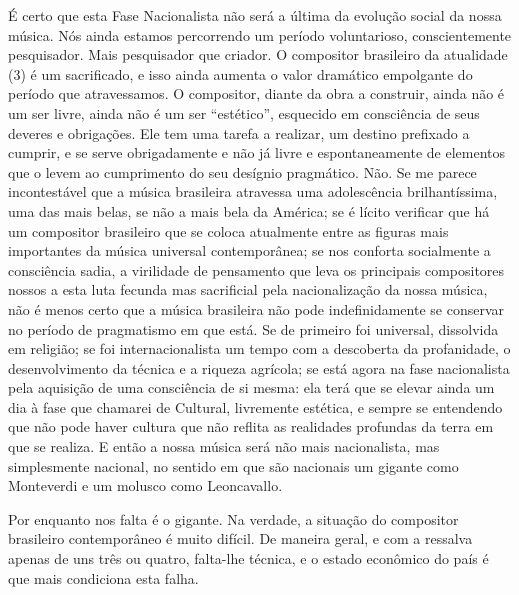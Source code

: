 É certo que esta Fase Nacionalista não será a última da evolução social
da nossa música. Nós ainda estamos percorrendo um período voluntarioso,
conscientemente pesquisador. Mais pesquisador que criador. O compositor
brasileiro da atualidade (3) é um sacrificado, e isso ainda aumenta o
valor dramático empolgante do período que atravessamos. O compositor,
diante da obra a construir, ainda não é um ser livre, ainda não é um ser
``estético'', esquecido em consciência de seus deveres e obrigações. Ele
tem uma tarefa a realizar, um destino prefixado a cumprir, e se serve
obrigadamente e não já livre e espontaneamente de elementos que o levem
ao cumprimento do seu desígnio pragmático. Não. Se me parece
incontestável que a música brasileira atravessa uma adolescência
brilhantíssima, uma das mais belas, se não a mais bela da América; se é
lícito verificar que há um compositor brasileiro que se coloca
atualmente entre as figuras mais importantes da música universal
contemporânea; se nos conforta socialmente a consciência sadia, a
virilidade de pensamento que leva os principais compositores nossos a
esta luta fecunda mas sacrificial pela nacionalização da nossa música,
não é menos certo que a música brasileira não pode indefinidamente se
conservar no período de pragmatismo em que está. Se de primeiro foi
universal, dissolvida em religião; se foi internacionalista um tempo com
a descoberta da profanidade, o desenvolvimento da técnica e a riqueza
agrícola; se está agora na fase nacionalista pela aquisição de uma
consciência de si mesma: ela terá que se elevar ainda um dia à fase que
chamarei de Cultural, livremente estética, e sempre se entendendo que
não pode haver cultura que não reflita as realidades profundas da terra
em que se realiza. E então a nossa música será não mais nacionalista,
mas simplesmente nacional, no sentido em que são nacionais um gigante
como Monteverdi e um molusco como Leoncavallo.

Por enquanto nos falta é o gigante. Na verdade, a situação do compositor
brasileiro contemporâneo é muito difícil. De maneira geral, e com a
ressalva apenas de uns três ou quatro, falta-lhe técnica, e o estado
econômico do país é que mais condiciona esta falha.

